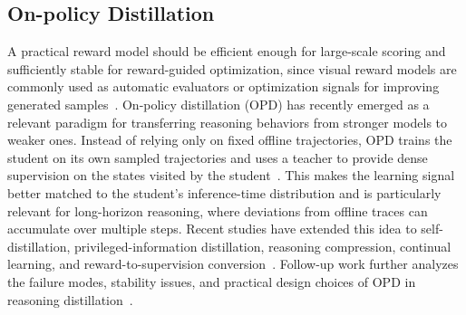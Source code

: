 \documentclass{article}
\newcommand{\mname}{Z-Reward\xspace}
\begin{document}
\subsection{On-policy Distillation}
A practical reward model should be efficient enough for large-scale scoring and sufficiently stable for reward-guided optimization, since visual reward models are commonly used as automatic evaluators or optimization signals for improving generated samples~\cite{xu2023imagereward,wu2025rewarddancerewardscalingvisual,yang2026joint}.
On-policy distillation (OPD) has recently emerged as a relevant paradigm for transferring reasoning behaviors from stronger models to weaker ones. Instead of relying only on fixed offline trajectories, OPD trains the student on its own sampled trajectories and uses a teacher to provide dense supervision on the states visited by the student~\cite{Agarwal2023OnPolicyDO,lu2025onpolicy}. This makes the learning signal better matched to the student's inference-time distribution and is particularly relevant for long-horizon reasoning, where deviations from offline traces can accumulate over multiple steps. Recent studies have extended this idea to self-distillation, privileged-information distillation, reasoning compression, continual learning, and reward-to-supervision conversion~\cite{zhao2026selfdistilledreasoneronpolicyselfdistillation,penaloza2026privileged,shenfeld2026selfdistillationenablescontinuallearning,Sang2026CRISPCR,he2026selfdistillationzeroselfrevisionturns}. Follow-up work further analyzes the failure modes, stability issues, and practical design choices of OPD in reasoning distillation~\cite{song2026surveyonpolicydistillationlarge,fu2026revisitingonpolicydistillationempirical,li2026rethinkingonpolicydistillationlarge,jang2026stableonpolicydistillationadaptive,zhu2026facesonpolicydistillationpitfalls}.

\end{document}
